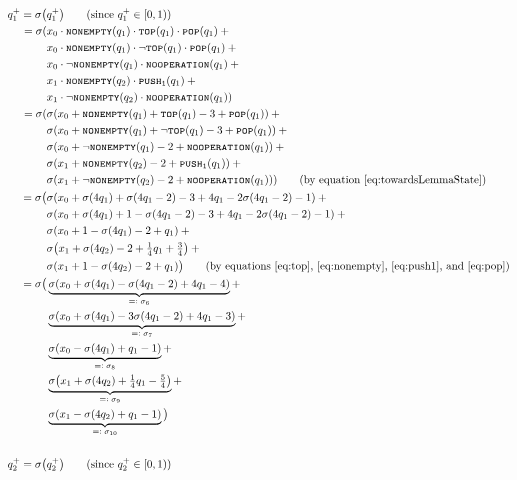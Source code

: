 \documentclass{book}
\newcommand{\eqdef}{=\vcentcolon}
\newcommand{\pushone}{\texttt{\textsc{push}}\textsubscript{\texttt{1}}}
\newcommand{\nonempty}{\textsc{\texttt{nonempty}}}
\newcommand{\tos}{\textsc{\texttt{top}}}
\newcommand{\pop}{\textsc{\texttt{pop}}}
\newcommand{\noop}{\textsc{\texttt{nooperation}}}
\theoremstyle{definition}
\theoremstyle{plain}
\theoremstyle{plain}
\theoremstyle{remark}
\theoremstyle{plain}
\begin{document}
\begin{align*}
		q_1^+=\sigma\big(&q_1^+\big) \tag{since $q_1^+\in[0,1)$} \\
			 =\sigma(&x_0\cdot\nonempty(q_1)\cdot\tos(q_1)\cdot\pop(q_1)\:+ \\
					 &x_0\cdot\nonempty(q_1)\cdot\lnot\tos(q_1)\cdot\pop(q_1)\:+ \\
					 &x_0\cdot\lnot\nonempty(q_1)\cdot\noop(q_1)\:+ \\
					 &x_1\cdot\nonempty(q_2)\cdot\pushone(q_1)\:+ \\
					 &x_1\cdot\lnot\nonempty(q_2)\cdot\noop(q_1)) \\
			 =\sigma(&\sigma(x_0+\nonempty(q_1)+\tos(q_1)-3+\pop(q_1))\:+ \\
					 &\sigma(x_0+\nonempty(q_1)+\lnot\tos(q_1)-3+\pop(q_1))\:+ \\
					 &\sigma(x_0+\lnot\nonempty(q_1)-2+\noop(q_1))\:+ \\
					 &\sigma(x_1+\nonempty(q_2)-2+\pushone(q_1))\:+ \\
					 &\sigma(x_1+\lnot\nonempty(q_2)-2+\noop(q_1))) \tag{by equation \ref{eq:towardsLemmaState}} \\
			 =\sigma\big(&\sigma(x_0+\sigma(4q_1)+\sigma(4q_1-2)-3+4q_1-2\sigma(4q_1-2)-1)\:+ \\
					 &\sigma(x_0+\sigma(4q_1)+1-\sigma(4q_1-2)-3+4q_1-2\sigma(4q_1-2)-1)\:+ \\
					 &\sigma(x_0+1-\sigma(4q_1)-2+q_1)\:+ \\
					 &\sigma\big(x_1+\sigma(4q_2)-2+\textstyle{\frac{1}{4}}q_1+\textstyle{\frac{3}{4}}\big)\:+ \\
					 &\sigma(x_1+1-\sigma(4q_2)-2+q_1)\big) \tag{by equations \ref{eq:top}, \ref{eq:nonempty}, \ref{eq:push1}, and \ref{eq:pop}} \\
			 =\sigma\big(&\underbrace{\sigma(x_0+\sigma(4q_1)-\sigma(4q_1-2)+4q_1-4)}_\text{$\eqdef\sigma_6$}+ \\
					 &\underbrace{\sigma(x_0+\sigma(4q_1)-3\sigma(4q_1-2)+4q_1-3)}_\text{$\eqdef\sigma_7$}+ \\
					 &\underbrace{\sigma(x_0-\sigma(4q_1)+q_1-1)}_\text{$\eqdef\sigma_8$}+ \\
					 &\underbrace{\sigma\big(x_1+\sigma(4q_2)+\textstyle{\frac{1}{4}}q_1-\textstyle{\frac{5}{4}}\big)}_\text{$\eqdef\sigma_9$}+ \\
					 &\underbrace{\sigma(x_1-\sigma(4q_2)+q_1-1)}_\text{$\eqdef\sigma_{10}$}\big) \\\\
		q_2^+=\sigma\big(&q_2^+\big) \tag{since $q_2^+\in[0,1)$} \\

\end{align*}
\end{document}
